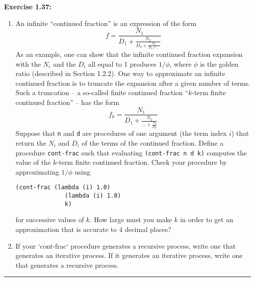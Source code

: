 \documentclass{article}
\begin{document}

\noindent \textbf{Exercise 1.37:}

\begin{enumerate}[label=\alph*.]
\item An infinite ``continued fraction'' is an expression of the form
  \begin{equation*}
    f = \frac{N_1}{
      D_1 + \frac{N_2}{
        D_2 + \frac{N_3}{D_3 + \dots}}}
  \end{equation*}
  As an example, one can show that the infinite continued fraction expansion
  with the $N_i$ and the $D_i$ all equal to 1 produces $1/\phi$, where $\phi$ is
  the golden ratio (described in Section 1.2.2).  One way to approximate an infinite
  continued fraction is to truncate the expansion after a given number of terms.
  Such a truncation -- a so-called finite continued fraction ``$k$-term finite
  continued fraction'' -- has the form
  \begin{equation*}
    f_k = \frac{N_1}{
      D_1 + \frac{N_2}{
        \dots + \frac{N_k}{D_k}}}
  \end{equation*}
  Suppose that \lstinline{n} and \lstinline{d} are procedures of one argument
  (the term index $i$) that return the $N_i$ and $D_i$ of the terms of
  the continued fraction.  Define a procedure \lstinline{cont-frac} such that evaluating
  \lstinline{(cont-frac n d k)} computes the value of the $k$-term finite continued
  fraction.  Check your procedure by approximating $1/\phi$ using
\begin{lstlisting}[style=scheme, frame=none]
   (cont-frac (lambda (i) 1.0)
              (lambda (i) 1.0)
              k)
\end{lstlisting}
  for successive values of $k$.  How large must you make $k$ in order to
  get an approximation that is accurate to 4 decimal places?

\item If your `cont-frac` procedure generates a recursive process, write one
  that generates an iterative process.  If it generates an iterative
  process, write one that generates a recursive process.

\end{enumerate}

\noindent \hrule




\end{document}
